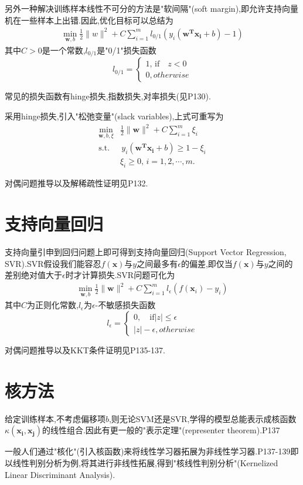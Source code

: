 另外一种解决训练样本线性不可分的方法是"软间隔"(soft margin),即允许支持向量机在一些样本上出错.因此,优化目标可以总结为
\begin{equation}\begin{split}
\min_{\mathbf w,b}\frac{1}{2}\|w\|^2+C\sum_{i=1}^ml_{0/1}(y_i(\mathbf{w^Tx_i}+b)-1)
\end{split}\end{equation}
其中$C>0$是一个常数,$l_{0/1}$是"0/1"损失函数
\begin{equation}l_{0/1}=\left\{\begin{array}{ll}
1,\,\text{if}\quad z<0\\
0,otherwise
\end{array}\right.\end{equation}

常见的损失函数有hinge损失,指数损失,对率损失(见P130).

采用hinge损失,引入"松弛变量"(slack variables),上式可重写为
\begin{equation}\begin{split}
\min_{\mathbf w,b,\xi}&\frac{1}{2}\|\mathbf w\|^2+C\sum_{i=1}^m\xi_i\\
\text{s.t.}&\,y_i(\mathbf{w^Tx_i}+b)\ge1-\xi_i\\
&\xi_i\ge0,\,i=1,2,\cdots,m.
\end{split}\end{equation}

对偶问题推导以及解稀疏性证明见P132.

\section{支持向量回归}

支持向量引申到回归问题上即可得到支持向量回归(Support Vector Regression, SVR).SVR假设我们能容忍$f(\mathbf x)$与$y$之间最多有$\epsilon$的偏差,即仅当$f(\mathbf x)$与$y$之间的差别绝对值大于$\epsilon$时才计算损失.SVR问题可化为
\begin{equation}\begin{split}
\min_{\mathbf w,b}\frac{1}{2}\|\mathbf w\|^2+C\sum_{i=1}^ml_\epsilon(f(\mathbf x_i)-y_i)
\end{split}\end{equation}
其中$C$为正则化常数,$l_\epsilon$为$\epsilon$-不敏感损失函数
\begin{equation}l_\epsilon=\left\{\begin{array}{ll}
0,\quad\text{if}|z|\le\epsilon\\
|z|-\epsilon,otherwise
\end{array}\right.\end{equation}

对偶问题推导以及KKT条件证明见P135-137.

\section{核方法}

给定训练样本,不考虑偏移项$b$,则无论SVM还是SVR,学得的模型总能表示成核函数$\kappa(\mathbf{x_i,x_j})$的线性组合.因此有更一般的"表示定理"(representer theorem).P137

一般人们通过"核化"(引入核函数)来将线性学习器拓展为非线性学习器.P137-139即以线性判别分析为例,将其进行非线性拓展,得到"核线性判别分析"(Kernelized Linear Discriminant Analysis).